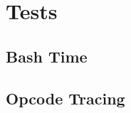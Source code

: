 \chapter{Tests}\label{ch:tests}

\section{Bash Time}\label{sec:bash-time}


\section{Opcode Tracing}\label{sec:opcode-tracing}
